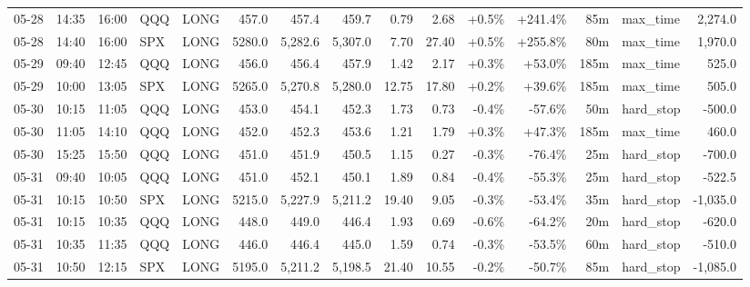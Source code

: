 \documentclass[11pt,a4paper,twoside]{article}
\begin{document}
\begin{landscape}
\begin{center}
\begin{longtable}{>{\color{txtmain}}l l l l l r r r r r r r r >{\color{txtmain}}l r}
05-28 & 14:35 & 16:00 & QQQ & LONG & 457.0 & 457.4 & 459.7 & 0.79 & 2.68 & \textcolor{wingreen}{+0.5\%} & \textcolor{wingreen}{+241.4\%} & 85m & max\_time & \textcolor{wingreen}{2,274.0} \\
05-28 & 14:40 & 16:00 & SPX & LONG & 5280.0 & 5,282.6 & 5,307.0 & 7.70 & 27.40 & \textcolor{wingreen}{+0.5\%} & \textcolor{wingreen}{+255.8\%} & 80m & max\_time & \textcolor{wingreen}{1,970.0} \\
05-29 & 09:40 & 12:45 & QQQ & LONG & 456.0 & 456.4 & 457.9 & 1.42 & 2.17 & \textcolor{wingreen}{+0.3\%} & \textcolor{wingreen}{+53.0\%} & 185m & max\_time & \textcolor{wingreen}{525.0} \\
05-29 & 10:00 & 13:05 & SPX & LONG & 5265.0 & 5,270.8 & 5,280.0 & 12.75 & 17.80 & \textcolor{wingreen}{+0.2\%} & \textcolor{wingreen}{+39.6\%} & 185m & max\_time & \textcolor{wingreen}{505.0} \\
05-30 & 10:15 & 11:05 & QQQ & LONG & 453.0 & 454.1 & 452.3 & 1.73 & 0.73 & \textcolor{lossred}{-0.4\%} & \textcolor{lossred}{-57.6\%} & 50m & hard\_stop & \textcolor{lossred}{-500.0} \\
05-30 & 11:05 & 14:10 & QQQ & LONG & 452.0 & 452.3 & 453.6 & 1.21 & 1.79 & \textcolor{wingreen}{+0.3\%} & \textcolor{wingreen}{+47.3\%} & 185m & max\_time & \textcolor{wingreen}{460.0} \\
05-30 & 15:25 & 15:50 & QQQ & LONG & 451.0 & 451.9 & 450.5 & 1.15 & 0.27 & \textcolor{lossred}{-0.3\%} & \textcolor{lossred}{-76.4\%} & 25m & hard\_stop & \textcolor{lossred}{-700.0} \\
05-31 & 09:40 & 10:05 & QQQ & LONG & 451.0 & 452.1 & 450.1 & 1.89 & 0.84 & \textcolor{lossred}{-0.4\%} & \textcolor{lossred}{-55.3\%} & 25m & hard\_stop & \textcolor{lossred}{-522.5} \\
05-31 & 10:15 & 10:50 & SPX & LONG & 5215.0 & 5,227.9 & 5,211.2 & 19.40 & 9.05 & \textcolor{lossred}{-0.3\%} & \textcolor{lossred}{-53.4\%} & 35m & hard\_stop & \textcolor{lossred}{-1,035.0} \\
05-31 & 10:15 & 10:35 & QQQ & LONG & 448.0 & 449.0 & 446.4 & 1.93 & 0.69 & \textcolor{lossred}{-0.6\%} & \textcolor{lossred}{-64.2\%} & 20m & hard\_stop & \textcolor{lossred}{-620.0} \\
05-31 & 10:35 & 11:35 & QQQ & LONG & 446.0 & 446.4 & 445.0 & 1.59 & 0.74 & \textcolor{lossred}{-0.3\%} & \textcolor{lossred}{-53.5\%} & 60m & hard\_stop & \textcolor{lossred}{-510.0} \\
05-31 & 10:50 & 12:15 & SPX & LONG & 5195.0 & 5,211.2 & 5,198.5 & 21.40 & 10.55 & \textcolor{lossred}{-0.2\%} & \textcolor{lossred}{-50.7\%} & 85m & hard\_stop & \textcolor{lossred}{-1,085.0} \\

\end{longtable}
\end{center}
\end{landscape}
\end{document}
